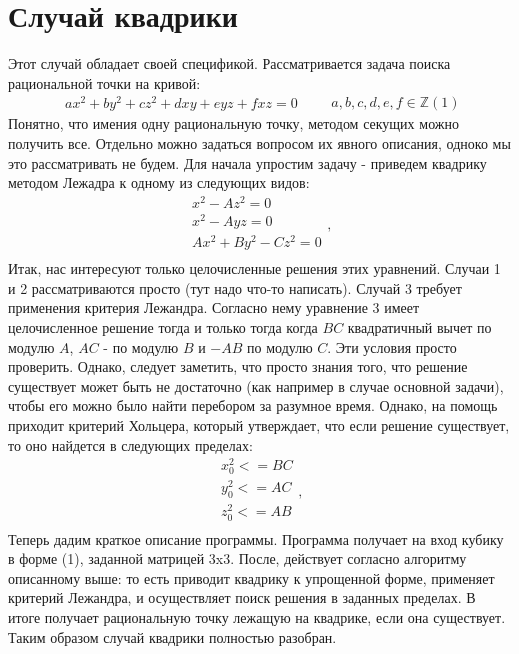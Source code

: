 \section*{Случай квадрики}
Этот случай обладает своей спецификой. Рассматривается задача поиска рациональной точки на кривой:
\newline
\[
\begin{aligned}
	ax^2 + by^2 + cz^2 + dxy + eyz + fxz = 0 
\end{aligned} \qquad a, b, c, d, e, f \in \mathbb{Z}    (1)
\]
Понятно, что имения одну рациональную точку, методом секущих можно получить все. Отдельно можно задаться вопросом их явного описания, одноко мы это рассматривать не будем. 
Для начала упростим задачу - приведем квадрику методом Лежадра к одному из следующих видов:
\[
\begin{aligned}
	x^2 - Az^2 = 0 \\
	x^2 - Ayz = 0 \\
	Ax^2 + By^2 - Cz^2 = 0 		\\
\end{aligned} 
,\] 
\newline
Итак, нас интересуют только целочисленные решения этих уравнений. Случаи 1 и 2 рассматриваются просто (тут надо что-то написать). Случай 3 требует применения критерия Лежандра. Согласно нему уравнение 3 имеет целочисленное решение тогда и только тогда когда $BC$ квадратичный вычет по модулю $A$, $AC$ - по модулю $B$ и $-AB$  по модулю $C$. Эти условия просто проверить. Однако, следует заметить, что просто знания того, что решение существует может быть не достаточно (как например в случае основной задачи), чтобы его можно было найти перебором за разумное время. Однако, на помощь приходит критерий Хольцера, который утверждает, что если решение существует, то оно найдется в следующих пределах:
\[
\begin{aligned}
	x_{0}^2 <= BC \\
	y_{0}^2 <= AC \\
	z_{0}^2 <= AB	\\
\end{aligned} 
,\] 
Теперь дадим краткое описание программы.  Программа получает на вход кубику в форме (1), заданной матрицей 3x3. После, действует согласно алгоритму описанному выше: то есть приводит квадрику к упрощенной форме, применяет критерий Лежандра, и осуществляет поиск решения в заданных пределах. В итоге получает рациональную точку лежащую на квадрике, если она существует. Таким образом случай квадрики полностью разобран.
\newline
\newline
